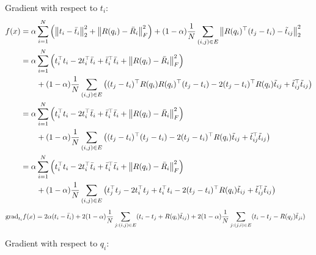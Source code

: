 Gradient with respect to $t_i$:
\begin{align}
    f(x) 
    &= \alpha \sum_{i=1}^N \left( \left\lVert t_i - \bar{t}_i \right\rVert_2^2 + \left\lVert R(q_i) - \bar{R}_i \right\rVert_F^2 \right) + (1-\alpha) \frac{1}{N} \sum_{(i,j)\in E} \left\lVert R(q_i)^\top (t_j - t_i) - \tilde{t}_{ij} \right\rVert_2^2
    \\ 
    &= \alpha \sum_{i=1}^N \left( t_i^\top t_i - 2t_i^\top \bar{t}_i + \bar{t}_i^\top \bar{t}_i + \left\lVert R(q_i) - \bar{R}_i \right\rVert_F^2 \right) \\
    &\qquad + (1-\alpha) \frac{1}{N} \sum_{(i,j)\in E} \left( (t_j-t_i)^\top R(q_i) R(q_i)^\top (t_j-t_i) - 2 (t_j-t_i)^\top R(q_i) \tilde{t}_{ij} + \tilde{t}_{ij}^\top \tilde{t}_{ij} \right) 
    \\ 
    &= \alpha \sum_{i=1}^N \left( t_i^\top t_i - 2t_i^\top \bar{t}_i + \bar{t}_i^\top \bar{t}_i + \left\lVert R(q_i) - \bar{R}_i \right\rVert_F^2 \right) \\
    &\qquad + (1-\alpha) \frac{1}{N} \sum_{(i,j)\in E} \left( (t_j-t_i)^\top (t_j-t_i) - 2 (t_j-t_i)^\top R(q_i) \tilde{t}_{ij} + \tilde{t}_{ij}^\top \tilde{t}_{ij} \right) 
    \\ 
    &= \alpha \sum_{i=1}^N \left( t_i^\top t_i - 2t_i^\top \bar{t}_i + \bar{t}_i^\top \bar{t}_i + \left\lVert R(q_i) - \bar{R}_i \right\rVert_F^2 \right) \\
    &\qquad + (1-\alpha) \frac{1}{N} \sum_{(i,j)\in E} \left( t_j^\top t_j - 2t_i^\top t_j + t_i^\top t_i - 2 (t_j-t_i)^\top R(q_i) \tilde{t}_{ij} + \tilde{t}_{ij}^\top \tilde{t}_{ij} \right) 
\end{align}
\begin{align}
    \text{grad}_{t_i} f(x)
    &= 2 \alpha (t_i - \bar{t}_i) 
    + 2(1-\alpha) \frac{1}{N} \sum_{j:(i,j)\in E} (t_i - t_j + R(q_i)\tilde{t}_{ij})
    + 2(1-\alpha) \frac{1}{N} \sum_{j:(j,i)\in E} (t_i - t_j - R(q_j)\tilde{t}_{ji})
\end{align}

Gradient with respect to $q_i$:

